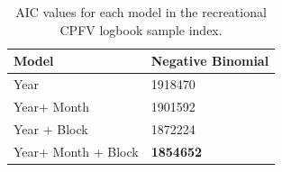 \documentclass[12pt,]{article}
\begin{document}
\begin{table}[ht]
\end{table}\begin{table}[ht]
\centering
\caption{AIC values for each model in the
                                          recreational CPFV logbook sample 
                                          index.} 
\label{tab:Fleet5_RecPC_CPFVlogbook_aic}
\begin{tabular}{ll}
  \hline
Model & Negative Binomial \\ 
  \hline
Year & 1918470 \\ 
  Year+ Month & 1901592 \\ 
  Year + Block & 1872224 \\ 
  Year+ Month + Block & \textbf{1854652} \\ 
   \hline
\end{tabular}
\end{table}\vspace{2in}
\end{document}
